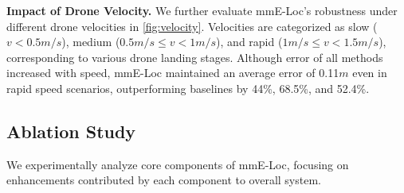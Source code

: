 \textbf{Impact of Drone Velocity.}
We further evaluate mmE-Loc's robustness under different drone velocities in \fig \ref{fig:velocity}. 
Velocities are categorized as slow ($v < 0.5m/s$), medium ($0.5m/s \leq v < 1m/s$), and rapid ($1m/s \leq v < 1.5m/s$), corresponding to various drone landing stages. 
Although error of all methods increased with speed, mmE-Loc maintained an average error of 0.11$m$ even in rapid speed scenarios, outperforming baselines by 44\%, 68.5\%, and 52.4\%.

\vspace{-0.1cm}
\subsection{Ablation Study} \label{5.4}
We experimentally analyze core components of mmE-Loc, focusing on enhancements contributed by each component to overall system.

